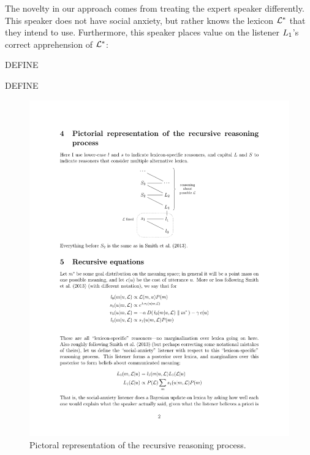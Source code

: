 The novelty in our approach comes from treating the expert speaker
differently. This speaker does not have social anxiety, but rather
knows the lexicon $\mathcal{L}^{\ast}$ that they intend to use. Furthermore,
this speaker places value on the listener $\ListenerOne$'s correct
apprehension of $\mathcal{L}^{\ast}$:

\begin{definition}[$\SpeakerK$]\label{def:s1}  
 DEFINE
\end{definition}

\begin{definition}[$\ListenerOne$]\label{def:l1}
  DEFINE
\end{definition}

\begin{figure}[htp]
  \centering
  \includegraphics[scale=1]{images/model}
  \caption{Pictoral representation of the recursive reasoning process.}
  \label{fig:model}
\end{figure}




